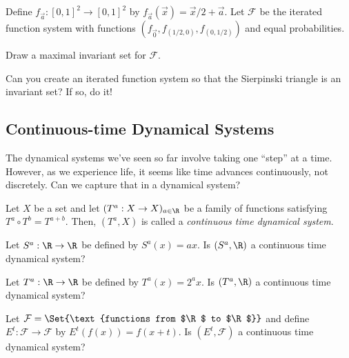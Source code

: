 	\question
	Define $f_{\vec a}:[0,1]^2\to[0,1]^2$ by $f_{\vec a}(\vec x)=\vec x/2 + \vec a$. Let $\mathcal F$ be
	the iterated function system with functions $(f_{\vec 0}, f_{(1/2,0)}, f_{(0,1/2)})$ and equal probabilities.
	\begin{parts}
		\item Draw a maximal invariant set for $\mathcal F$.
		\item Can you create an iterated function system so that the Sierpinski triangle is
			an invariant set? If so, do it!
	\end{parts}


	\newpage
	\subsection*{Continuous-time Dynamical Systems}
	The dynamical systems we've seen so far involve taking one ``step'' at a time.
	However, as we experience life, it seems like time advances continuously, not discretely.
	Can we capture that in a dynamical system?

	\begin{definition}
		Let $X$ be a set and let $(T^a:X\to X)_{a\in \R}$ be a family of functions
		satisfying $T^a\circ T^b=T^{a+b}$. Then, $(T^a,X)$ is called a \emph{continuous time
		dynamical system}.
	\end{definition}

	\question
	\begin{parts}
		\item Let $S^a:\R\to\R$ be defined by $S^a(x)=ax$. Is $(S^a,\R)$ a continuous time dynamical system?
		\item Let $T^a:\R\to\R$ be defined by $T^a(x)=2^a x$. Is $(T^a,\R)$ a continuous time dynamical system?
		\item Let $\mathcal F=\Set{\text{functions from $\R$ to $\R$}}$ and define $E^t:\mathcal F\to\mathcal F$
			by $E^t(f(x)) = f(x+t)$. Is $(E^t,\mathcal F)$ a continuous time dynamical system?
	\end{parts}

